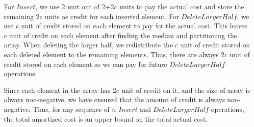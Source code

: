 \documentclass[11pt]{article}
\begin{document}
\begin{enumerate}
For $Insert$, we use 2 unit out of 2+2$c$ units to pay the actual cost and
store the remaining 2$c$ units as credit for each inserted element. For
$DeleteLargerHalf$, we use $c$ unit of credit stored on each element to pay for
the actual cost. This leaves $c$ unit of credit on each element after finding
the median and partitioning the array. When deleting the larger half,
we redistribute the $c$ unit of credit stored on each deleted element to the
remaining elements. Thus, there are always 2$c$ unit of credit stored on each
element so we can pay for future $DeleteLargerHalf$ operations.

Since each element in the array has 2$c$ unit of credit on it, and the
size of array is always non-negative, we have ensured that the amount
of credit is always non-negative. Thus, for any sequence of $n$
$Insert$ and $DeleteLargerHalf$ operations, the total amortized cost
is an upper bound on the total actual cost. 

\end{enumerate}
\end{document}
